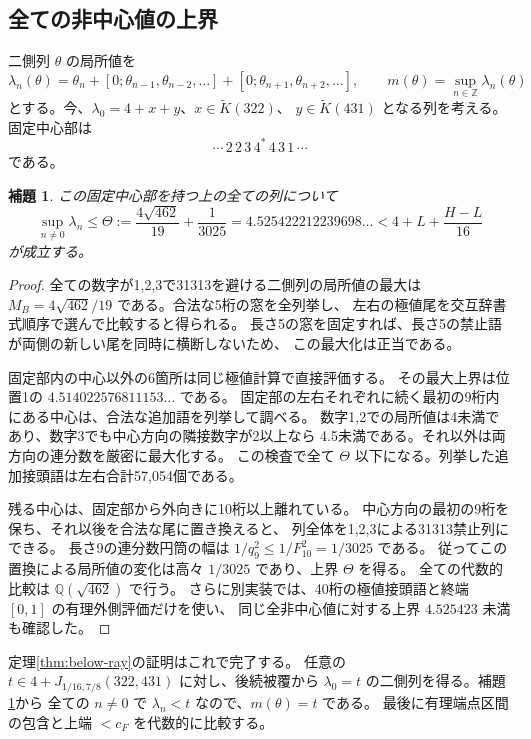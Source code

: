 \documentclass[10pt,a4paper]{article}
\newtheorem{lemma}[theorem]{補題}
\begin{document}
\subsection{全ての非中心値の上界}
二側列 $\theta$ の局所値を
\[
 \lambda_n(\theta)=\theta_n+[0;\theta_{n-1},\theta_{n-2},\ldots]
                         +[0;\theta_{n+1},\theta_{n+2},\ldots],\qquad
 m(\theta)=\sup_{n\in\mathbb Z}\lambda_n(\theta)
\]
とする。今、$\lambda_0=4+x+y$、$x\in\widetilde K(322)$、
$y\in\widetilde K(431)$ となる列を考える。固定中心部は
\[
 \cdots\,2\,2\,3\,4^*\,4\,3\,1\,\cdots
\]
である。
\begin{lemma}\label{lem:below-noncentral}
この固定中心部を持つ上の全ての列について
\[
 \sup_{n\ne0}\lambda_n\le
 \Theta:=\frac{4\sqrt{462}}{19}+\frac1{3025}
   =4.525422212239698\ldots
   <4+L+\frac{H-L}{16}
\]
が成立する。
\end{lemma}
\begin{proof}
全ての数字が1,2,3で31313を避ける二側列の局所値の最大は
$M_B=4\sqrt{462}/19$ である。合法な5桁の窓を全列挙し、
左右の極値尾を交互辞書式順序で選んで比較すると得られる。
長さ5の窓を固定すれば、長さ5の禁止語が両側の新しい尾を同時に横断しないため、
この最大化は正当である。

固定部内の中心以外の6箇所は同じ極値計算で直接評価する。
その最大上界は位置1の $4.514022576811153\ldots$ である。
固定部の左右それぞれに続く最初の9桁内にある中心は、合法な追加語を列挙して調べる。
数字1,2での局所値は4未満であり、数字3でも中心方向の隣接数字が2以上なら
4.5未満である。それ以外は両方向の連分数を厳密に最大化する。
この検査で全て $\Theta$ 以下になる。列挙した追加接頭語は左右合計57,054個である。

残る中心は、固定部から外向きに10桁以上離れている。
中心方向の最初の9桁を保ち、それ以後を合法な尾に置き換えると、
列全体を1,2,3による31313禁止列にできる。
長さ9の連分数円筒の幅は $1/q_9^2\le1/F_{10}^2=1/3025$ である。
従ってこの置換による局所値の変化は高々 $1/3025$ であり、上界 $\Theta$ を得る。
全ての代数的比較は $\mathbb Q(\sqrt{462})$ で行う。
さらに別実装では、40桁の極値接頭語と終端 $[0,1]$ の有理外側評価だけを使い、
同じ全非中心値に対する上界 $4.525423$ 未満も確認した。
\end{proof}

定理\ref{thm:below-ray}の証明はこれで完了する。
任意の $t\in4+J_{1/16,7/8}(322,431)$ に対し、後続被覆から
$\lambda_0=t$ の二側列を得る。補題\ref{lem:below-noncentral}から
全ての $n\ne0$ で $\lambda_n<t$ なので、$m(\theta)=t$ である。
最後に有理端点区間の包含と上端 $<c_F$ を代数的に比較する。
\end{document}
